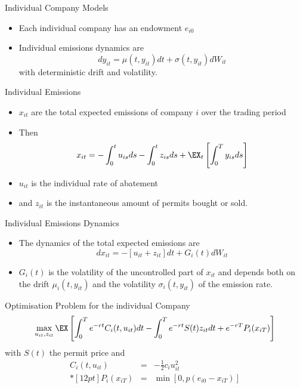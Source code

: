 {Individual Company Models}
\begin{itemize}
\item<1-> Each individual company has an endowment $e_{i0}$
\item<2-> Individual emissions dynamics are
\begin{equation}
dy_{it}= \mu(t, y_{it})dt + \sigma(t, y_{it})dW_{it}
\end{equation}
with deterministic drift and volatility.
\end{itemize}



{Individual Emissions}
\begin{itemize}
\item<1-> $x_{it}$ are the total expected emissions of company $i$ over the trading period
\item<2-> Then
\begin{equation}
x_{it}=-\int_0^tu_{is} ds -\int_0^tz_{is}ds + \EX_t\left[\int_0^T y_{is} ds \right]
\end{equation}
\item<3-> $u_{it}$ is the individual rate of abatement
\item<4-> and $z_{it}$ is the instantaneous amount of permits bought or sold.
\end{itemize}


{Individual Emissions Dynamics}
\begin{itemize}
\item<1-> The dynamics of the total expected emissions are
\begin{equation}
dx_{it}=-[u_{it}+z_{it}] dt + G_i(t) dW_{it}
\end{equation}
\item<2-> $G_i(t)$ is the volatility of the uncontrolled part of $x_{it}$ and depends both on the drift $\mu_i(t, y_{it})$
and the volatility $\sigma_i(t,y_{it})$ of the emission rate.
\end{itemize}



{Optimisation Problem for the individual Company}
\begin{equation}
\max_{u_{it}, z_{it}} \EX\left[\int_0^Te^{-rt}C_i(t,u_{it})dt - \int_0^T e^{-rt}S(t)z_{it}dt+ e^{-rT}P_i(x_{iT})\right]
\end{equation}
with $S(t)$ the permit price and
$$
\begin{array}{lll}
C_i(t,u_{it}) &=& - \frac{1}{2}c_i u_{it}^2 \\*[12pt]
P_i(x_{iT}) &=& \min[0,p(e_{i0}-x_{iT})]
\end{array}
$$



